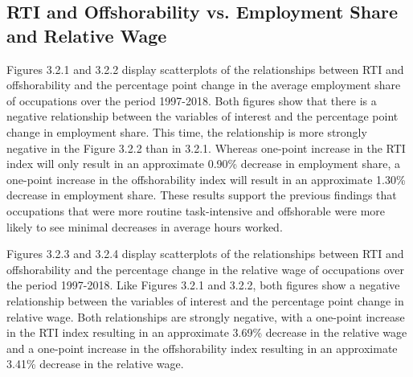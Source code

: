 \documentclass[undefended]{bumrp}
\begin{document}
\newpage

\subsection{RTI and Offshorability vs. Employment Share and Relative Wage}

Figures 3.2.1 and 3.2.2 display scatterplots of the relationships between RTI and offshorability and the percentage point change in the average employment share of occupations over the period 1997-2018. Both figures show that there is a negative relationship between the variables of interest and the percentage point change in employment share. This time, the relationship is more strongly negative in the Figure 3.2.2 than in 3.2.1. Whereas one-point increase in the RTI index will only result in an approximate 0.90\% decrease in employment share, a one-point increase in the offshorability index will result in an approximate 1.30\% decrease in employment share. These results support the previous findings that occupations that were more routine task-intensive and offshorable were more likely to see minimal decreases in average hours worked. 

Figures 3.2.3 and 3.2.4 display scatterplots of the relationships between RTI and offshorability and the percentage change in the relative wage of occupations over the period 1997-2018. Like Figures 3.2.1 and 3.2.2, both figures show a negative relationship between the variables of interest and the percentage point change in relative wage. Both relationships are strongly negative, with a one-point increase in the RTI index resulting in an approximate 3.69\% decrease in the relative wage and a one-point increase in the offshorability index resulting in an approximate 3.41\% decrease in the relative wage. 
\end{document}
